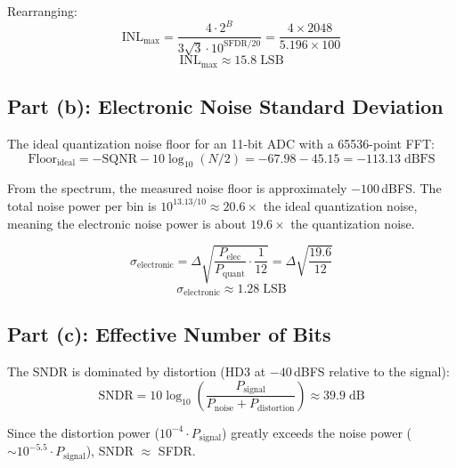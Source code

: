 \documentclass{article}
\begin{document}
Rearranging:
\begin{equation}
    \text{INL}_\text{max} = \frac{4 \cdot 2^B}{3\sqrt{3} \cdot 10^{\text{SFDR}/20}} = \frac{4 \times 2048}{5.196 \times 100}
\end{equation}
\begin{equation}
    \boxed{\text{INL}_\text{max} \approx 15.8\;\text{LSB}}
\end{equation}

\subsection{Part (b): Electronic Noise Standard Deviation}

The ideal quantization noise floor for an 11-bit ADC with a 65536-point FFT:
\begin{equation}
    \text{Floor}_\text{ideal} = -\text{SQNR} - 10\log_{10}(N/2) = -67.98 - 45.15 = -113.13\;\text{dBFS}
\end{equation}

From the spectrum, the measured noise floor is approximately $-100$\,dBFS. The total noise power per bin is $10^{13.13/10} \approx 20.6\times$ the ideal quantization noise, meaning the electronic noise power is about $19.6\times$ the quantization noise.

\begin{equation}
    \sigma_\text{electronic} = \Delta \sqrt{\frac{P_\text{elec}}{P_\text{quant}} \cdot \frac{1}{12}} = \Delta \sqrt{\frac{19.6}{12}}
\end{equation}
\begin{equation}
    \boxed{\sigma_\text{electronic} \approx 1.28\;\text{LSB}}
\end{equation}

\subsection{Part (c): Effective Number of Bits}

The SNDR is dominated by distortion (HD3 at $-40$\,dBFS relative to the signal):
\begin{equation}
    \text{SNDR} = 10\log_{10}\!\left(\frac{P_\text{signal}}{P_\text{noise} + P_\text{distortion}}\right) \approx 39.9\;\text{dB}
\end{equation}

Since the distortion power ($10^{-4} \cdot P_\text{signal}$) greatly exceeds the noise power ($\sim 10^{-5.5} \cdot P_\text{signal}$), SNDR $\approx$ SFDR.
\end{document}
